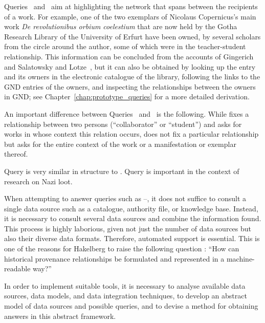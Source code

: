Queries~ and~
aim at highlighting the network
that spans between the recipients of a work.
For example, one of the two exemplars of Nicolaus Copernicus's
main work \emph{De revolutionibus orbium coelestium} \autocite{Kopernikus1543}
that are now held by the Gotha Research Library of the University of Erfurt
have been owned, by several scholars
from the circle around the author,
some of which were in the teacher-student relationship.
This information can be concluded
from the accounts of Gingerich~\autocite[p.\,69]{Gingerich2002}
and Salatowsky and Lotze~\autocite[p.\,142]{Salatowsky2015},
but it can also be obtained by looking up the entry and its owners in the electronic catalogue of the library,
following the links to the GND entries of the owners,
and inspecting the relationships between the owners in GND;
see Chapter~\ref{chap:prototype_queries} for a more detailed derivation.

An important difference between Queries~ and~ is the following.
While  fixes a relationship between two persons (\enquote{collaborator} or \enquote{student})
and asks for works in whose context this relation occurs,
 does not fix a particular relationship but asks for the entire context of
the work or a manifestation or exemplar thereof.

Query  is very similar in structure to .
Query  is important in the context of research on Nazi loot.

When attempting to answer queries such as --,
it does not suffice to consult a single data source such as
a catalogue, authority file, or knowledge base.
Instead, it is necessary to consult several data sources
and combine the information found. This process is highly laborious,
given not just the number of data sources but also their diverse
data formats. Therefore, automated support is essential.
This is one of the reasons for Hakelberg
to raise the following question \autocite[p.\,46, translated from German]{Hakelberg2016}:
\enquote{How can historical provenance relationships be formulated and represented
in a machine-readable way?}

In order to implement suitable tools,
it is necessary to analyse available data sources, data models, and data integration techniques,
to develop an abstract model of data sources and possible queries,
and to devise a method for obtaining answers in this abstract framework.


